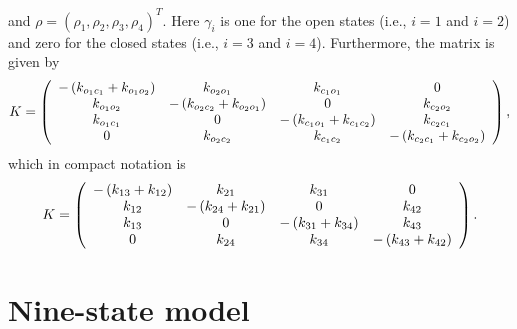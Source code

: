 and $\rho=(\rho_1,\rho_2,\rho_3,\rho_4)^T.$ 
Here $\gamma_{i}$ is one for the open states (i.e., $i=1$ and $i=2$) and zero for
the closed states (i.e., $i=3$ and $i=4$). Furthermore, the matrix is given by
\[
K=\left(
\begin{array}
[c]{cccc}
-\left(  k_{o_{1}c_{1}}+k_{o_{1}o_{2}}\right)   & k_{o_{2}o_{1}} &
k_{c_{1}o_{1}} & 0\\
k_{o_{1}o_{2}} & -\left(  k_{o_{2}c_{2}}+k_{o_{2}o_{1}}\right)   & 0 &
k_{c_{2}o_{2}}\\
k_{o_{1}c_{1}} & 0 & -\left(  k_{c_{1}o_{1}}+k_{c_{1}c_{2}}\right)   &
k_{c_{2}c_{1}}\\
0 & k_{o_{2}c_{2}} & k_{c_{1}c_{2}} & -\left(  k_{c_{2}c_{1}}+k_{c_{2}o_{2}
}\right)
\end{array}
\right),
\]
which in compact notation is
\[
K=\left(
\begin{array}
[c]{cccc}
-\left(  k_{13}+k_{12}\right)   & k_{21} & k_{31} & 0\\
k_{12} & -\left(  k_{24}+k_{21}\right)   & 0 & k_{42}\\
k_{13} & 0 & -\left(  k_{31}+k_{34}\right)   & k_{43}\\
0 & k_{24} & k_{34} & -\left(  k_{43}+k_{42}\right)
\end{array}
\right)  .
\]

\bigskip
\section{Nine-state model}

